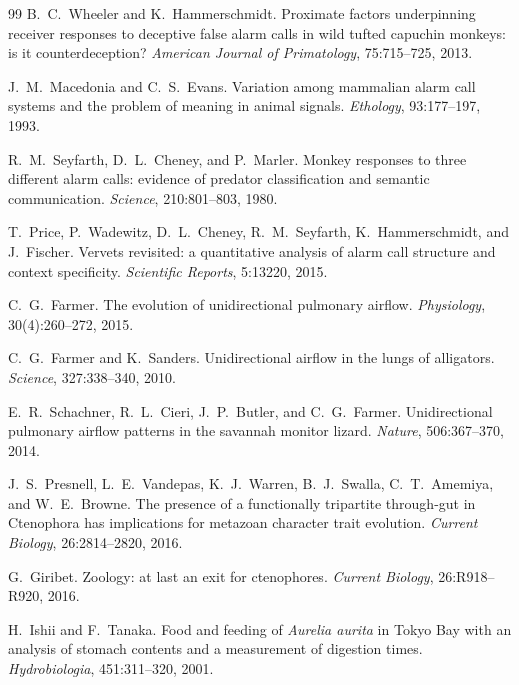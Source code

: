 \begin{thebibliography}{99}
B.~C.~Wheeler and K.~Hammerschmidt. \newblock Proximate factors underpinning receiver responses to deceptive false alarm calls in wild tufted capuchin monkeys: is it counterdeception? \newblock \emph{American Journal of Primatology}, 75:715--725, 2013.


J.~M.~Macedonia and C.~S.~Evans. \newblock Variation among mammalian alarm call systems and the problem of meaning in animal signals. \newblock \emph{Ethology}, 93:177--197, 1993.

R.~M.~Seyfarth, D.~L.~Cheney, and P.~Marler. \newblock Monkey responses to three different alarm calls: evidence of predator classification and semantic communication. \newblock \emph{Science}, 210:801--803, 1980.

T.~Price, P.~Wadewitz, D.~L.~Cheney, R.~M.~Seyfarth, K.~Hammerschmidt, and J.~Fischer. \newblock Vervets revisited: a quantitative analysis of alarm call structure and context specificity. \newblock \emph{Scientific Reports}, 5:13220, 2015.


C.~G.~Farmer. \newblock The evolution of unidirectional pulmonary airflow. \newblock \emph{Physiology}, 30(4):260--272, 2015.

C.~G.~Farmer and K.~Sanders. \newblock Unidirectional airflow in the lungs of alligators. \newblock \emph{Science}, 327:338--340, 2010.

E.~R.~Schachner, R.~L.~Cieri, J.~P.~Butler, and C.~G.~Farmer. \newblock Unidirectional pulmonary airflow patterns in the savannah monitor lizard. \newblock \emph{Nature}, 506:367--370, 2014.

J.~S.~Presnell, L.~E.~Vandepas, K.~J.~Warren, B.~J.~Swalla, C.~T.~Amemiya, and W.~E.~Browne. \newblock The presence of a functionally tripartite through-gut in Ctenophora has implications for metazoan character trait evolution. \newblock \emph{Current Biology}, 26:2814--2820, 2016.

G.~Giribet. \newblock Zoology: at last an exit for ctenophores. \newblock \emph{Current Biology}, 26:R918--R920, 2016.

H.~Ishii and F.~Tanaka. \newblock Food and feeding of \emph{Aurelia aurita} in Tokyo Bay with an analysis of stomach contents and a measurement of digestion times. \newblock \emph{Hydrobiologia}, 451:311--320, 2001.


\end{thebibliography}
